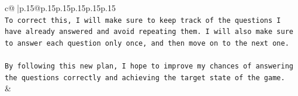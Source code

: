 \documentclass{article}
\begin{document}
{\begin{supertabular}{c@{$\;$}|p{.15\linewidth}@{}p{.15\linewidth}p{.15\linewidth}p{.15\linewidth}p{.15\linewidth}p{.15\linewidth}}
{{{\\ 
\texttt{To correct this, I will make sure to keep track of the questions I have already answered and avoid repeating them. I will also make sure to answer each question only once, and then move on to the next one.} \\
\\ 
\texttt{By following this new plan, I hope to improve my chances of answering the questions correctly and achieving the target state of the game.} \\
            }
        }
    }
    & \\ \\

\end{supertabular}
}
\end{document}
